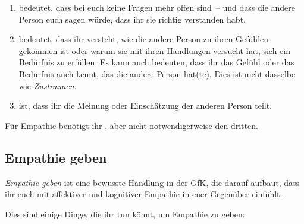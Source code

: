 \begin{enumerate}
    \item {} bedeutet, dass bei euch keine Fragen mehr offen sind~-- und dass die andere Person euch sagen würde, dass ihr sie richtig verstanden habt.
    \item {} bedeutet, dass ihr versteht, wie die andere Person zu ihren Gefühlen gekommen ist oder warum sie mit ihren Handlungen versucht hat, sich ein Bedürfnis zu erfüllen. Es kann auch bedeuten, dass ihr das Gefühl oder das Bedürfnis auch kennt, das die andere Person hat(te). Dies ist nicht dasselbe wie \emph{Zustimmen}.
    \item {} ist, dass ihr die Meinung oder Einschätzung der anderen Person teilt.
\end{enumerate}

Für Empathie benötigt ihr , aber nicht notwendigerweise den dritten.

\subsection{Empathie geben}
\label{empathie-geben}

\emph{Empathie geben} ist eine bewusste Handlung in der GfK, die darauf aufbaut, dass ihr euch mit affektiver und kognitiver Empathie in euer Gegenüber einfühlt.

Dies sind einige Dinge, die ihr tun könnt, um Empathie zu geben:

